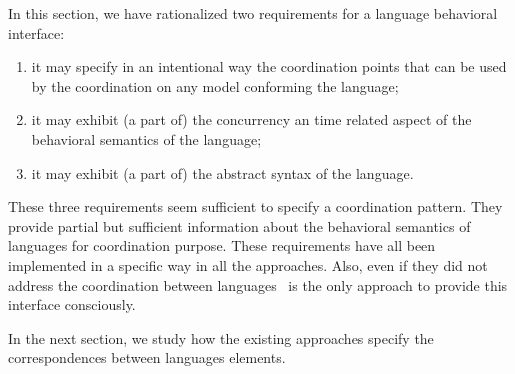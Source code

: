 In this section, we have rationalized two requirements for a language behavioral interface:
\begin{enumerate}
\item it may specify in an intentional way the coordination points that can be used by the coordination on any model conforming the language;
\item it may exhibit (a part of) the concurrency an time related aspect of the behavioral semantics of the language;
\item it may exhibit (a part of) the abstract syntax of the language.
\end{enumerate}

These three requirements seem sufficient to specify a coordination pattern. They provide partial but sufficient information about the behavioral semantics of languages for coordination purpose.  These requirements have all been implemented in a specific way in all the approaches. Also, even if they did not address the coordination between languages~\cite{sle13-combemale} is the only approach to provide this interface consciously.

In the next section, we study how the existing approaches specify the correspondences between languages elements.	

	    	
	    	
	    				
	    				
	    				
	    				
